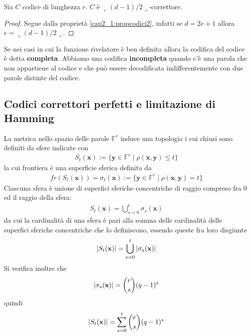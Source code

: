\begin{prop}\label{cap2_1:propcodici3}
   Sia $C$ codice di lunghezza $r$. $C$ è $\llcorner (d-1)/2 \lrcorner$-correttore.
\end{prop}
\begin{proof}
   Segue dalla proprietà \ref{cap2_1:propcodici2}, infatti se $d=2e+1$ allora $e=\llcorner (d-1)/2 \lrcorner$.
\end{proof}
\noindent
Se nei casi in cui la funzione rivelatore è ben definita allora la codifica del codice è detta {\bf completa}. Abbiamo una codifica {\bf incompleta} quando c'è una parola che non appartiene al codice e che può essere decodificata indifferentemente con due parole distinte del codice.

\subsection{Codici correttori perfetti e limitazione di Hamming}

La metrica nello spazio delle parole $\mathbb{F}^{r}$ induce una topologia i cui chiusi sono definiti da sfere indicate con
\begin{align*}
   S_{t}(\mathbf{x}) := \lbrace \mathbf{y} \in \mathbb{F}^{r} \mid \rho(\mathbf{x},\mathbf{y}) \leq t \rbrace
\end{align*}
la cui frontiera è una superficie sferica definita da
\begin{align*}
   fr(S_{t}(\mathbf{x})) = \sigma_{t}(\mathbf{x})
   := \lbrace \mathbf{y} \in \mathbb{F}^{r} \mid \rho(\mathbf{x},\mathbf{y}) = t \rbrace
\end{align*}
Ciascuna sfera è unione di superfici sferiche  concentriche di raggio compreso fra $0$ ed il raggio della sfera:
\begin{align*}
   S_{t}(\mathbf{x}) = \bigcup_{s=0}^{t} \sigma_{s}(\mathbf{x})
\end{align*}
da cui la cardinalità di una sfera è pari alla somma delle cardinalità delle superfici sferiche concentriche che lo definiscono, essendo queste fra loro disgiunte
\begin{align*}
   \arrowvert S_{t}(\mathbf{x})\arrowvert  = \bigcup_{s=0}^{t} \arrowvert\sigma_{s}(\mathbf{x})\arrowvert
\end{align*}
Si verifica inoltre che
\begin{align*}
   \arrowvert\sigma_{s}(\mathbf{x})\arrowvert  = \binom{r}{s}(q-1)^{s}
\end{align*}
quindi
\begin{align*}
   \arrowvert S_{t}(\mathbf{x})\arrowvert  = \sum_{s=0}^{t} \binom{r}{s}(q-1)^{s}
\end{align*}

